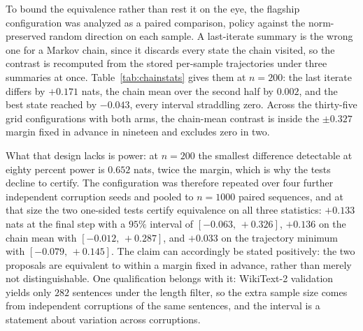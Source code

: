 To bound the equivalence rather than rest it on the eye, the flagship configuration was analyzed as a paired comparison, policy against the norm-preserved random direction on each sample. A last-iterate summary is the wrong one for a Markov chain, since it discards every state the chain visited, so the contrast is recomputed from the stored per-sample trajectories under three summaries at once. Table~\ref{tab:chainstats} gives them at $n = 200$: the last iterate differs by $+0.171$ nats, the chain mean over the second half by $0.002$, and the best state reached by $-0.043$, every interval straddling zero. Across the thirty-five grid configurations with both arms, the chain-mean contrast is inside the $\pm 0.327$ margin fixed in advance in nineteen and excludes zero in two.

What that design lacks is power: at $n = 200$ the smallest difference detectable at eighty percent power is $0.652$ nats, twice the margin, which is why the tests decline to certify. The configuration was therefore repeated over four further independent corruption seeds and pooled to $n = 1000$ paired sequences, and at that size the two one-sided tests certify equivalence on all three statistics: $+0.133$ nats at the final step with a $95\%$ interval of $[-0.063,\, +0.326]$, $+0.136$ on the chain mean with $[-0.012,\, +0.287]$, and $+0.033$ on the trajectory minimum with $[-0.079,\, +0.145]$. The claim can accordingly be stated positively: the two proposals are equivalent to within a margin fixed in advance, rather than merely not distinguishable. One qualification belongs with it: WikiText-2 validation yields only $282$ sentences under the length filter, so the extra sample size comes from independent corruptions of the same sentences, and the interval is a statement about variation across corruptions.

